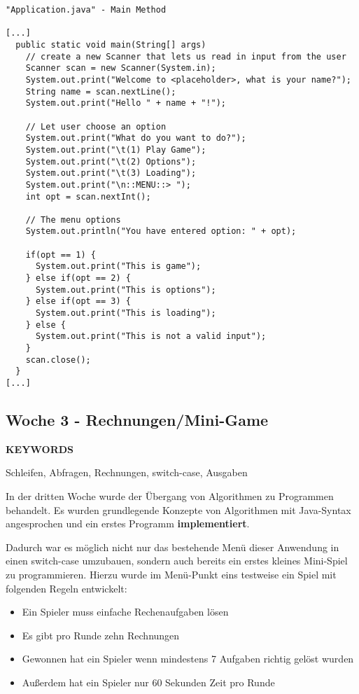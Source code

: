 \begin{verbatim}
"Application.java" - Main Method

[...]
  public static void main(String[] args)
    // create a new Scanner that lets us read in input from the user
    Scanner scan = new Scanner(System.in);
    System.out.print("Welcome to <placeholder>, what is your name?");
    String name = scan.nextLine();
    System.out.print("Hello " + name + "!");
    
    // Let user choose an option
    System.out.print("What do you want to do?");
    System.out.print("\t(1) Play Game");
    System.out.print("\t(2) Options");
    System.out.print("\t(3) Loading");
    System.out.print("\n::MENU::> ");
    int opt = scan.nextInt();
    
    // The menu options
    System.out.println("You have entered option: " + opt);
    
    if(opt == 1) {
      System.out.print("This is game");
    } else if(opt == 2) {
      System.out.print("This is options");
    } else if(opt == 3) {
      System.out.print("This is loading");
    } else {
      System.out.print("This is not a valid input");
    }
    scan.close();
  }
[...]

\end{verbatim}
\subsection{Woche 3 - Rechnungen/Mini-Game}
\label{ch:weekthree}
\line
\begin{center}
	\textbf{KEYWORDS}
	
	Schleifen, Abfragen, Rechnungen, switch-case, Ausgaben
\end{center}
\line
In der dritten Woche wurde der Übergang von Algorithmen zu Programmen behandelt. Es wurden grundlegende Konzepte von Algorithmen mit Java-Syntax angesprochen und ein erstes Programm \textbf{implementiert}.

Dadurch war es möglich nicht nur das bestehende Menü dieser Anwendung in einen switch-case umzubauen, sondern auch bereits ein erstes kleines Mini-Spiel zu programmieren. Hierzu wurde im Menü-Punkt eins testweise ein Spiel mit folgenden Regeln entwickelt:

\begin{itemize}
	\item Ein Spieler muss einfache Rechenaufgaben lösen
	\item Es gibt pro Runde zehn Rechnungen
	\item Gewonnen hat ein Spieler wenn mindestens 7 Aufgaben richtig gelöst wurden
	\item Außerdem hat ein Spieler nur 60 Sekunden Zeit pro Runde
\end{itemize}

